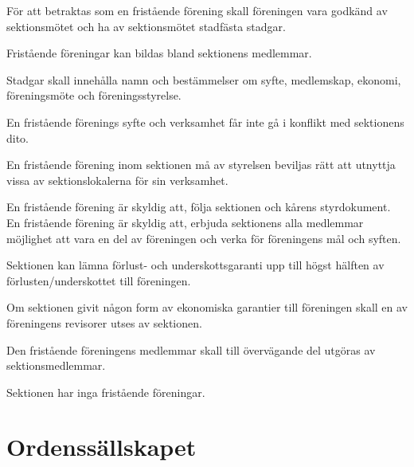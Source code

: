 \documentclass[stadgar]{dsekprotokoll}
\begin{document}
\begin{stadgeavsnitt}


För att betraktas som en fristående förening skall föreningen vara godkänd
av sektionsmötet och ha av sektionsmötet stadfästa stadgar.


Fristående föreningar kan bildas bland sektionens medlemmar.


Stadgar skall innehålla namn och bestämmelser om syfte, medlemskap,
ekonomi, föreningsmöte och föreningsstyrelse.


En fristående förenings syfte och verksamhet får inte gå i konflikt med
sektionens dito.


En fristående förening inom sektionen må av styrelsen beviljas rätt att
utnyttja vissa av sektionslokalerna för sin verksamhet.


En fristående förening är skyldig att, följa sektionen och kårens styrdokument. En fristående förening är skyldig att, erbjuda sektionens alla medlemmar möjlighet att vara en del av föreningen och verka för föreningens mål och syften.


Sektionen kan lämna förlust- och underskottsgaranti upp till högst hälften
av förlusten/underskottet till föreningen.


Om sektionen givit någon form av ekonomiska garantier till föreningen skall
en av föreningens revisorer utses av sektionen.


Den fristående föreningens medlemmar skall till övervägande del utgöras av
sektionsmedlemmar.

Sektionen har inga fristående föreningar.

\end{stadgeavsnitt}

\section{Ordenssällskapet}
\end{document}
